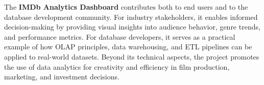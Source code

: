 \documentclass[sigconf, pbalance]{acmart}
\begin{document}
The \textbf{IMDb Analytics Dashboard} contributes both to end users and to the database development community. For industry stakeholders, it enables informed decision-making by providing visual insights into audience behavior, genre trends, and performance metrics. For database developers, it serves as a practical example of how OLAP principles, data warehousing, and ETL pipelines can be applied to real-world datasets. Beyond its technical aspects, the project promotes the use of data analytics for creativity and efficiency in film production, marketing, and investment decisions.






\end{document}
